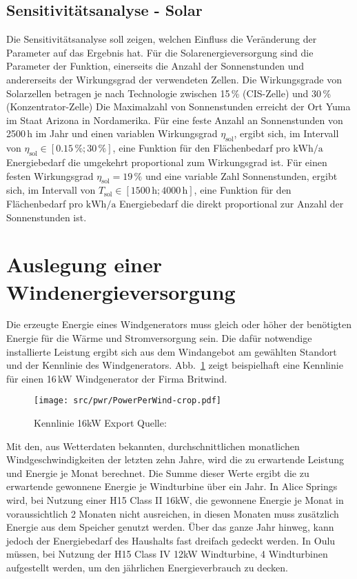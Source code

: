   \subsection{Sensitivitätsanalyse - Solar}
  Die Sensitivitätsanalyse soll zeigen, welchen Einfluss die Veränderung der Parameter auf das Ergebnis hat.
  Für die Solarenergieversorgung sind die Parameter der Funktion, einerseits die Anzahl der Sonnenstunden und andererseits der Wirkungsgrad der verwendeten Zellen.
  Die Wirkungsgrade von Solarzellen betragen je nach Technologie zwischen 15\,\% (CIS-Zelle) und 30\,\% (Konzentrator-Zelle)\cite{BK:QEEK}
  Die Maximalzahl von Sonnenstunden erreicht der Ort Yuma im Staat Arizona in Nordamerika\cite{Webp:YAY}.
  Für eine feste Anzahl an Sonnenstunden von 2500\,h im Jahr und einen variablen Wirkungsgrad \(\eta_\mathrm{sol}\), ergibt sich, im Intervall von \( \eta_\mathrm{sol} \in \mathrm{[0.15\,\%;30\,\%]}\), 
  eine Funktion für den Flächenbedarf pro \(\mathrm{kWh/a}\) Energiebedarf die umgekehrt proportional zum Wirkungsgrad ist.
  Für einen festen Wirkungsgrad \( \eta_\mathrm{sol} = 19\,\% \) und eine variable Zahl Sonnenstunden, ergibt sich, im Intervall von \( T_\mathrm{sol} \in \mathrm{[1500\,h;4000\,h]}\), 
  eine Funktion für den Flächenbedarf pro \(\mathrm{kWh/a}\) Energiebedarf die direkt proportional zur Anzahl der Sonnenstunden ist.

\section{Auslegung einer Windenergieversorgung}
  Die erzeugte Energie eines Windgenerators muss gleich oder höher der benötigten Energie für die Wärme und Stromversorgung sein.
  Die dafür notwendige installierte Leistung ergibt sich aus dem Windangebot am gewählten Standort und der Kennlinie des Windgenerators.
  Abb.~\ref{fig:WINDKENN} zeigt beispielhaft eine Kennlinie für einen 16\,kW Windgenerator der Firma Britwind.
  \begin{figure}
    \centering
    \texttt{[image: src/pwr/PowerPerWind-crop.pdf]}
    \caption{Kennlinie 16kW Export Quelle:\cite{Datasheet:BRITWIND}}\label{fig:WINDKENN}
  \end{figure}
  Mit den, aus Wetterdaten bekannten, durchschnittlichen monatlichen Windgeschwindigkeiten der letzten zehn Jahre, 
  wird die zu erwartende Leistung und Energie je Monat berechnet. 
  Die Summe dieser Werte ergibt die zu erwartende gewonnene Energie je Windturbine über ein Jahr. 
  In Alice Springs wird, bei Nutzung einer H15 Class II 16kW, die gewonnene Energie je Monat in voraussichtlich 2 Monaten
  nicht ausreichen, in diesen Monaten muss zusätzlich Energie aus dem Speicher genutzt werden.
  Über das ganze Jahr hinweg, kann jedoch der Energiebedarf des Haushalts fast dreifach gedeckt werden. 
  In Oulu müssen, bei Nutzung der H15 Class IV 12kW Windturbine, 
  4 Windturbinen aufgestellt werden, um den jährlichen Energieverbrauch zu decken.
   

